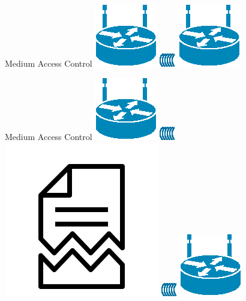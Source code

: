 \documentclass{beamer}
\begin{document}
\begin{frame}{Medium Access Control}
	\includegraphics[width=0.2\linewidth]{wireless.eps}
	\includegraphics[width=0.2\linewidth,angle=180,origin=c]{wave.eps}
	\hfill
	\includegraphics[width=0.2\linewidth]{wireless.eps}
\end{frame}

\begin{frame}{Medium Access Control}
	\includegraphics[width=0.2\linewidth]{wireless.eps}
	\includegraphics[width=0.2\linewidth,angle=180,origin=c]{wave.eps}
	\includegraphics[width=0.16\linewidth]{error.png}
	\includegraphics[width=0.2\linewidth]{wave.eps}
	\includegraphics[width=0.2\linewidth]{wireless.eps}
\end{frame}
\end{document}
